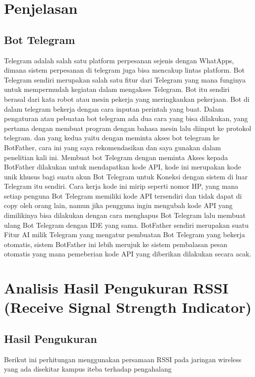 \documentclass[conference]{IEEEtran}
\begin{document}
\section{Penjelasan}
\subsection{Bot Telegram}
    Telegram adalah salah satu platform perpesanan sejenis dengan
    WhatApps, dimana sistem perpesanan di telegram juga bisa mencakup
    lintas platform. Bot Telegram 
    sendiri merupakan salah satu fitur dari Telegram yang mana funginya untuk
    mempermudah kegiatan dalam mengakses Telegram. Bot itu sendiri
    berasal dari kata robot atau mesin pekerja yang meringkankan pekerjaan.
    Bot di dalam telegram bekerja dengan cara inputan perintah yang buat.
    Dalam pengaturan atau pebuatan bot telegram ada dua cara yang 
    bisa dilakukan, yang pertama dengan membuat program dengan bahasa
    mesin lalu diinput ke protokol telegram. dan yang kedua yaitu dengan
    meminta akses bot telegram ke BotFather, cara ini yang saya
    rekomendasikan dan saya gunakan dalam penelitian kali ini. Membuat bot
    Telegram dengan meminta Akses kepada BotFather dilakukan untuk
    mendapatkan kode API, kode ini merupakan kode unik khusus bagi suatu
    akun Bot Telegram untuk Koneksi dengan sistem di luar Telegram itu
    sendiri. Cara kerja kode ini mirip seperti nomor HP, yang mana setiap
    penguna Bot Telegram memiliki kode API tersendiri dan tidak dapat di copy
    oleh orang lain, namun jika pengguna ingin mengubah kode API yang
    dimilikinya bisa dilakukan dengan cara menghapus Bot Telegram lalu
    membuat ulang Bot Telegram dengan IDE yang sama.
    BotFather sendiri merupakan suatu Fitur AI milik Telegram yang
    mengatur pembuatan Bot Telegram yang bekerja otomatis, sistem
    BotFather ini lebih merujuk ke sistem pembalasan pesan otomatis yang
    mana pemeberian kode API yang diberikan dilakukan secara acak.

\section{Analisis Hasil Pengukuran RSSI (Receive Signal Strength Indicator)}
\subsection{Hasil Pengukuran}
Berikut ini perhitungan menggunakan persamaan RSSI 
pada jaringan wireless yang ada disekitar 
kampus iteba terhadap pengahalang
\end{document}
